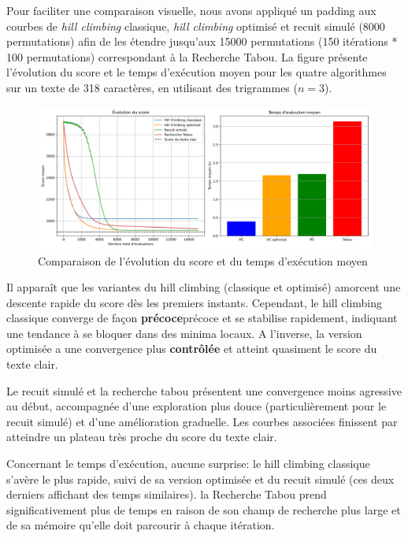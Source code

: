 \documentclass[a4paper]{article}
\begin{document}
Pour faciliter une comparaison visuelle, nous avons appliqué un padding aux courbes de \textit{hill climbing} classique, \textit{hill climbing} optimisé et recuit simulé (8000 permutations) afin de les étendre jusqu'aux 15000 permutations 
(150 itérations * 100 permutations) correspondant à la Recherche Tabou. La figure présente l'évolution du score et le temps d'exécution moyen pour les quatre algorithmes sur un texte de 318 caractères, en utilisant des trigrammes ($n=3$).

\begin{figure}[H]
    \centering
    \includegraphics[width=\textwidth, keepaspectratio, height=\textheight]{comparaison_algorithmes_et_temps.png}
    \caption{Comparaison de l'évolution du score et du temps d'exécution moyen}
    \label{fig:score-temps}
\end{figure}

Il apparaît que les variantes du hill climbing (classique et optimisé) amorcent une descente rapide du score dès les premiers instants. Cependant, le hill climbing classique converge de façon \textbf{précoce}précoce et se stabilise rapidement, indiquant une tendance à se bloquer dans des minima locaux. 
A l'inverse, la version optimisée a une convergence plus \textbf{contrôlée} et atteint quasiment le score du texte clair.

Le recuit simulé et la recherche tabou présentent une convergence moins agressive au début, accompagnée d'une exploration plus douce (particulièrement pour le recuit simulé) et d'une amélioration graduelle. Les courbes associées finissent par atteindre un plateau très proche du score du texte clair.


Concernant le temps d'exécution, aucune surprise: le hill climbing classique s'avère le plus rapide, suivi de sa version optimisée et du recuit simulé (ces deux derniers affichant des temps similaires). la Recherche Tabou prend significativement plus de temps en raison de son champ de recherche plus large
et de sa mémoire qu'elle doit parcourir à chaque itération.
\end{document}
